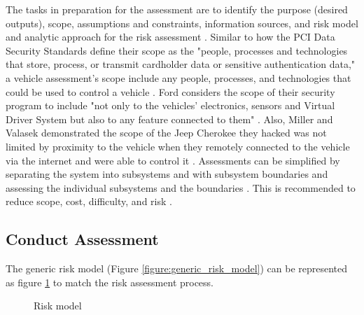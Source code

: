 \documentclass{article}
\begin{document}
\noindent The tasks in preparation for the assessment are to identify the purpose (desired outputs), scope, assumptions and constraints, information sources, and risk model and analytic approach for the risk assessment \citep[pages 24-28]{national_institute_of_standards_and_technology_nist_2012}. Similar to how the PCI Data Security Standards define their scope as the "people, processes and technologies that store, process, or transmit cardholder data or sensitive authentication data," a vehicle assessment's scope include any people, processes, and technologies that could be used to control a vehicle \citep{pci_security_standards_council_payment_2016}. Ford considers the scope of their security program to include "not only to the vehicles' electronics, sensors and Virtual Driver System but also to any feature connected to them" \citep[page 35]{ford_motor_company_matter_2018}. Also, Miller and Valasek demonstrated the scope of the Jeep Cherokee they hacked was not limited by proximity to the vehicle when they remotely connected to the vehicle via the internet and were able to control it \citep{miller_remote_2015}. Assessments can be simplified by separating the system into subsystems and with subsystem boundaries and assessing the individual subsystems and the boundaries \citep[page 13]{national_institute_of_standards_and_technology_nist_2017}. This is recommended to reduce scope, cost, difficulty, and risk \citep[page 11]{pci_security_standards_council_payment_2016}.

\subsection{Conduct Assessment}

The generic risk model (Figure \ref{figure:generic_risk_model}) can be represented as figure \ref{figure:risk_model} to match the risk assessment process.

\begin{figure}[h] \centering
{}
    \caption{Risk model}
\label{figure:risk_model}
\end{figure}
\end{document}
